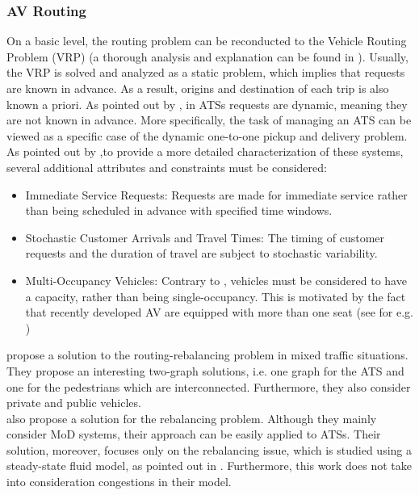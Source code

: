 \subsubsection*{AV Routing}
On a basic level, the routing problem can be reconducted to the Vehicle Routing Problem (VRP) (a thorough analysis and explanation can be found in \cite{doi:10.1137/1.9780898718515}). Usually, the VRP is solved and analyzed as a static problem, which implies that requests are known in advance. As a result, origins and destination of each trip is also known a priori. As pointed out by , in ATSs requests are dynamic, meaning they are not known in advance. More specifically, the task of managing an ATS can be viewed as a specific case of the dynamic one-to-one pickup and delivery problem. As pointed out by ,to provide a more detailed characterization of these systems, several additional attributes and constraints must be considered:
\begin{itemize}
	\item Immediate Service Requests: Requests are made for immediate service rather than being scheduled in advance with specified time windows.
	\item Stochastic Customer Arrivals and Travel Times: The timing of customer requests and the duration of travel are subject to stochastic variability.
	\item Multi-Occupancy Vehicles: Contrary to \cite{zhang2016}, vehicles must be considered to have a capacity, rather than being single-occupancy. This is motivated by the fact that recently developed AV are equipped with more than one seat (see for e.g. \cite{dlr-nemo-bili})
\end{itemize}

 propose a solution to the routing-rebalancing problem in mixed traffic situations. They propose an interesting two-graph solutions, i.e. one graph for the ATS and one for the pedestrians which are interconnected. Furthermore, they also consider private and public vehicles. \\
 also propose a solution for the rebalancing problem. Although they mainly consider MoD systems, their approach can be easily applied to ATSs. Their solution, moreover, focuses only on the rebalancing issue, which is studied using a steady-state fluid model, as pointed out in \cite{9294258}. Furthermore, this work does not take into consideration congestions in their model. \\

